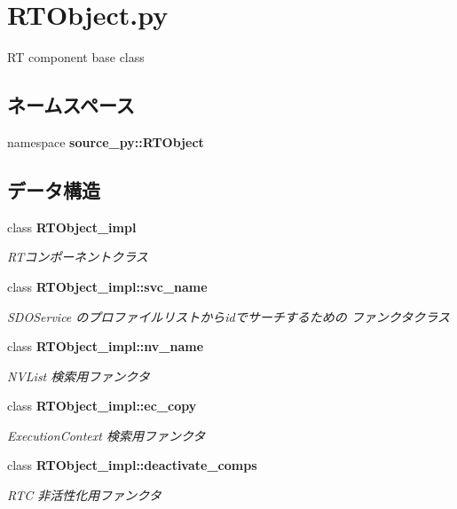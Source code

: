 \section{RTObject.py}
\label{_r_t_object_8py}
RT component base class 

\subsection*{ネームスペース}
\begin{CompactItemize}
\item 
namespace \textbf{source\_\-py::RTObject}
\end{CompactItemize}
\subsection*{データ構造}
\begin{CompactItemize}
\item 
class {\bf RTObject\_\-impl}
\begin{CompactList}\small\item\em RTコンポーネントクラス \item\end{CompactList}\item 
class {\bf RTObject\_\-impl::svc\_\-name}
\begin{CompactList}\small\item\em SDOService のプロファイルリストからidでサーチするための ファンクタクラス \item\end{CompactList}\item 
class {\bf RTObject\_\-impl::nv\_\-name}
\begin{CompactList}\small\item\em NVList 検索用ファンクタ \item\end{CompactList}\item 
class {\bf RTObject\_\-impl::ec\_\-copy}
\begin{CompactList}\small\item\em ExecutionContext 検索用ファンクタ \item\end{CompactList}\item 
class {\bf RTObject\_\-impl::deactivate\_\-comps}
\begin{CompactList}\small\item\em RTC 非活性化用ファンクタ \item\end{CompactList}\end{CompactItemize}


